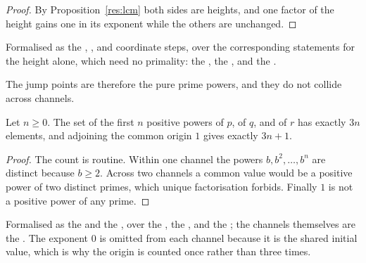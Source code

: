 \begin{proof}
By Proposition~\ref{res:lcm} both sides are heights, and one factor of the height
gains one in its exponent while the others are unchanged.
\end{proof}

\noindent Formalised as the
,
,
and
coordinate steps, over the corresponding statements for the height alone, which
need no primality: the
, the
,
and the
.

The jump points are therefore the pure prime powers, and they do not collide
across channels.

\begin{theorem}\label{res:count}
Let $n\ge0$.  The set of the first $n$ positive powers of $p$, of $q$, and of
$r$ has exactly $3n$ elements, and adjoining the common origin $1$ gives
exactly $3n+1$.
\end{theorem}

\begin{proof}
The count is routine.  Within one channel the powers $b,b^{2},\ldots,b^{n}$ are distinct because
$b\ge2$.  Across two channels a common value would be a positive power of two
distinct primes, which unique factorisation forbids.  Finally $1$ is not a
positive power of any prime.
\end{proof}

\noindent Formalised as the
 and the
, over the
, the
, and the
; the channels themselves are the
.  The exponent $0$ is omitted from each channel because it is the
shared initial value, which is why the origin is counted once rather than three
times.


